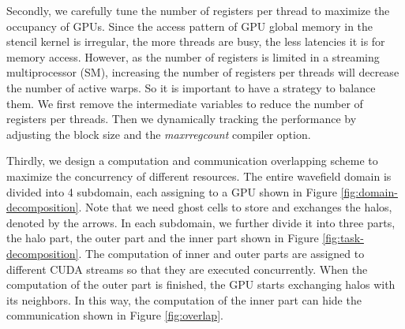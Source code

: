 \documentclass{paris17}
\begin{document}
Secondly, we carefully tune the number of registers per thread to maximize the occupancy of GPUs. Since the access pattern of GPU global memory in the stencil kernel is irregular, the more threads are busy, the less latencies it is for memory access. However, as the number of registers is limited in a streaming multiprocessor (SM), increasing the number of registers per threads will decrease the number of active warps. So it is important to have a strategy to balance them. We first remove the intermediate variables to reduce the number of registers per threads. Then we dynamically tracking the performance by adjusting the block size and the \emph{maxrregcount} compiler option.

Thirdly, we design a computation and communication overlapping scheme to maximize the concurrency of different resources. The entire wavefield domain is divided into 4 subdomain, each assigning to a GPU shown in Figure \ref{fig:domain-decomposition}. Note that we need ghost cells to store and exchanges the halos, denoted by the arrows. In each subdomain, we further divide it into three parts, the halo part, the outer part and the inner part shown in Figure \ref{fig:task-decomposition}. The computation of inner and outer parts are assigned to different CUDA streams so that they are executed concurrently. When the computation of the outer part is finished, the GPU starts exchanging halos with its neighbors. In this way, the computation of the inner part can hide the communication shown in Figure \ref{fig:overlap}.
\end{document}
